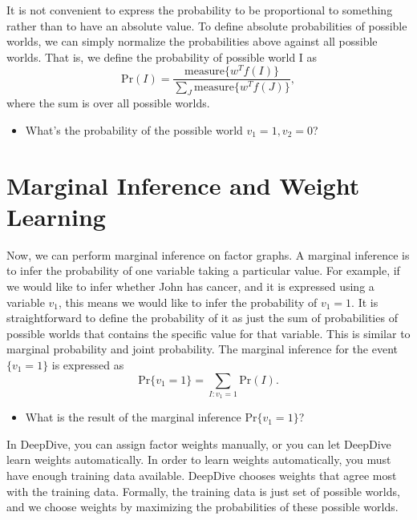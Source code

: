 \documentclass[11pt]{article}
\begin{document}
It is not convenient to express the probability to be proportional to something rather than to have an absolute value. To define absolute probabilities of possible worlds, we can simply normalize the probabilities above against all possible worlds. That is, we define the probability of possible world I as
\[ \text{Pr}(I) = \frac{\text{measure}\{w^T f(I)\}}{\sum_{J} \text{measure}\{w^T f(J)\}}, \]
where the sum is over all possible worlds. 
\begin{itemize}
\item What's the probability of the possible world $v_1=1,v_2=0$?
\end{itemize}

\section{Marginal Inference and Weight Learning}

Now, we can perform marginal inference on factor graphs. A marginal inference is to infer the probability of one variable taking a particular value. For example, if we would like to infer whether John has cancer, and it is expressed using a variable $v_1$, this means we would like to infer the probability of $v_1 = 1$. It is straightforward to define the probability of it as just the sum of probabilities of possible worlds that contains the specific value for that variable. This is similar to marginal probability and joint probability. The marginal inference for the event $\{v_1 = 1\}$ is expressed as
\[ \text{Pr}\{v_1 = 1\} = \sum_{I:v_1=1} \text{Pr}(I). \]
\begin{itemize}
\item What is the result of the marginal inference $\text{Pr}\{v_1 = 1\}$?
\end{itemize}

In DeepDive, you can assign factor weights manually, or you can let DeepDive learn weights automatically. In order to learn weights automatically, you must have enough training data available. DeepDive chooses weights that agree most with the training data. Formally, the training data is just set of possible worlds, and we choose weights by maximizing the probabilities of these possible worlds.
\end{document}
